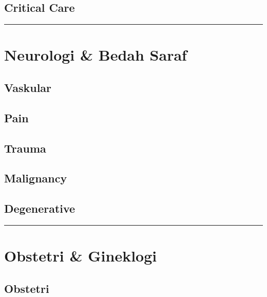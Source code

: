 \documentclass[
]{book}
\begin{document}
\hypertarget{critical-care}{%
\subsection{Critical Care}\label{critical-care}}

\begin{center}\rule{0.5\linewidth}{0.5pt}\end{center}

\hypertarget{neurologi-bedah-saraf}{%
\section{Neurologi \& Bedah Saraf}\label{neurologi-bedah-saraf}}

\hypertarget{vaskular}{%
\subsection{Vaskular}\label{vaskular}}

\hypertarget{pain}{%
\subsection{Pain}\label{pain}}

\hypertarget{trauma-1}{%
\subsection{Trauma}\label{trauma-1}}

\hypertarget{malignancy-3}{%
\subsection{Malignancy}\label{malignancy-3}}

\hypertarget{degenerative}{%
\subsection{Degenerative}\label{degenerative}}

\begin{center}\rule{0.5\linewidth}{0.5pt}\end{center}

\hypertarget{obstetri-gineklogi-1}{%
\section{Obstetri \& Gineklogi}\label{obstetri-gineklogi-1}}

\hypertarget{obstetri}{%
\subsection{Obstetri}\label{obstetri}}
\end{document}
